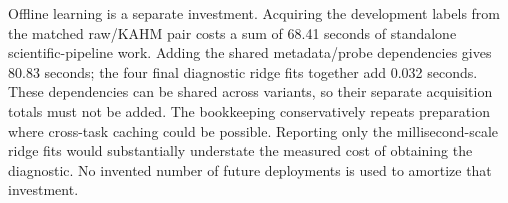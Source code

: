 Offline learning is a separate investment. Acquiring the development
labels from the matched raw/KAHM pair costs a sum of 68.41 seconds of
standalone scientific-pipeline work. Adding the shared metadata/probe
dependencies gives 80.83 seconds; the four final diagnostic ridge fits
together add 0.032 seconds. These dependencies can be shared across
variants, so their separate acquisition totals must not be added.
The bookkeeping conservatively repeats preparation where cross-task
caching could be possible. Reporting only the millisecond-scale ridge
fits would substantially understate the measured cost of obtaining the
diagnostic. No invented number of future deployments is used to
amortize that investment.
